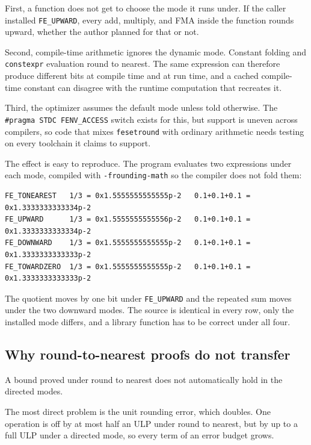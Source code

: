 \documentclass[manuscript, nonacm]{acmart}
\begin{document}
  First, a function does not get to choose the mode it runs under. If the
  caller installed \texttt{FE\_UPWARD}, every add, multiply, and FMA inside
  the function rounds upward, whether the author planned for that or not.

  Second, compile-time arithmetic ignores the dynamic mode. Constant
  folding and \texttt{constexpr} evaluation round to nearest. The same
  expression can therefore produce different bits at compile time and at
  run time, and a cached compile-time constant can disagree with the
  runtime computation that recreates it.

  Third, the optimizer assumes the default mode unless told otherwise. The
  \texttt{\#pragma STDC FENV\_ACCESS} switch exists for this, but support
  is uneven across compilers, so code that mixes \texttt{fesetround} with
  ordinary arithmetic needs testing on every toolchain it claims to
  support.

  The effect is easy to reproduce. The program
  evaluates two expressions under each mode, compiled with
  \texttt{-frounding-math} so the compiler does not fold them:

  \begin{lstlisting}[style=output]
FE_TONEAREST   1/3 = 0x1.5555555555555p-2   0.1+0.1+0.1 = 0x1.3333333333334p-2
FE_UPWARD      1/3 = 0x1.5555555555556p-2   0.1+0.1+0.1 = 0x1.3333333333334p-2
FE_DOWNWARD    1/3 = 0x1.5555555555555p-2   0.1+0.1+0.1 = 0x1.3333333333333p-2
FE_TOWARDZERO  1/3 = 0x1.5555555555555p-2   0.1+0.1+0.1 = 0x1.3333333333333p-2
  \end{lstlisting}

  The quotient moves by one bit under \texttt{FE\_UPWARD} and the repeated
  sum moves under the two downward modes. The source is identical in every
  row, only the installed mode differs, and a library function has to be
  correct under all four.

  \subsection{Why round-to-nearest proofs do not transfer}

  A bound proved under round to nearest does not automatically hold in the
  directed modes.

  The most direct problem is the unit rounding error, which doubles. One
  operation is off by at most half an ULP under round to nearest, but by up
  to a full ULP under a directed mode, so every term of an error budget
  grows.
\end{document}

